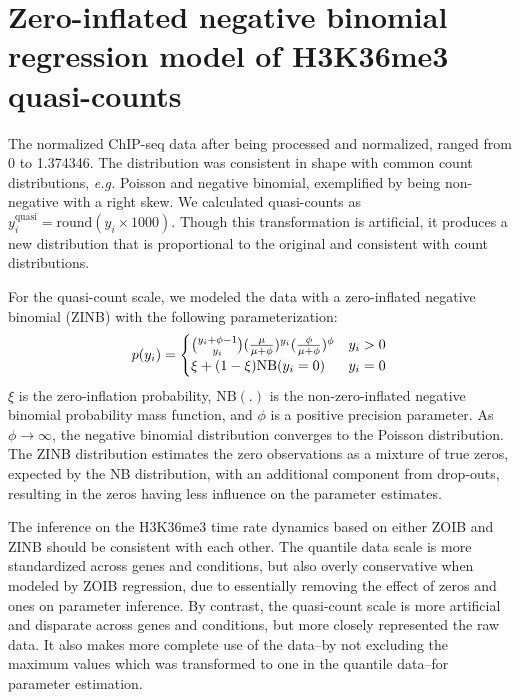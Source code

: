 \documentclass[12pt]{extarticle}
\newcommand{\eg}{\emph{e.g.}\xspace}
\begin{document}
\section*{Zero-inflated negative binomial regression model of H3K36me3 quasi-counts}
The normalized ChIP-seq data after being processed and normalized, ranged from 0 to 1.374346. The distribution was consistent in shape with common count distributions, \eg Poisson and negative binomial, exemplified by being non-negative with a right skew. We calculated quasi-counts as $y_{i}^{\text{quasi}} = \text{round}(y_{i} \times 1000)$. Though this transformation is artificial, it produces a new distribution that is proportional to the original and consistent with count distributions.

For the quasi-count scale, we modeled the data with a zero-inflated negative binomial (ZINB) with the following parameterization:
\begin{equation}
	p(y_{i}) = \begin{cases} 
			{{y_{i} + \phi - 1}\choose y_{i}} \large(\frac{\mu}{\mu + \phi}\large)^{y_{i}}\large(\frac{\phi}{\mu + \phi}\large)^{\phi} & y_{i} > 0 \\
      			\xi + (1 - \xi)\text{NB}(y_{i} = 0) & y_{i} = 0
   			\end{cases}
\end{equation}
$\xi$ is the zero-inflation probability, $\text{NB}(.)$ is the non-zero-inflated negative binomial probability mass function, and $\phi$ is a positive precision parameter. As $\phi \rightarrow \infty$, the negative binomial distribution converges to the Poisson distribution. The ZINB distribution estimates the zero observations as a mixture of true zeros, expected by the NB distribution, with an additional component from drop-outs, resulting in the zeros having less influence on the parameter estimates.

The inference on the H3K36me3 time rate dynamics based on either ZOIB and ZINB should be consistent with each other. The quantile data scale is more standardized across genes and conditions, but also overly conservative when modeled by ZOIB regression, due to essentially removing the effect of zeros and ones on parameter inference. By contrast, the quasi-count scale is more artificial and disparate across genes and conditions, but more closely represented the raw data. It also makes more complete use of the data--by not excluding the maximum values which was transformed to one in the quantile data--for parameter estimation.
\end{document}
